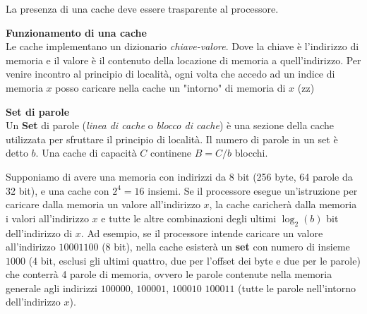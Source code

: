 \begin{note}
    La presenza di una cache deve essere trasparente al processore.
\end{note}

\begin{defn}
    \textbf{Funzionamento di una cache} \\
    Le cache implementano un dizionario \textit{chiave-valore}. Dove la chiave è
    l'indirizzo di memoria e il valore è il contenuto della locazione di memoria
    a quell'indirizzo. Per venire incontro al principio di località, ogni volta
    che accedo ad un indice di memoria $x$ posso caricare nella cache un
    "intorno" di memoria di $x$ (zz)
\end{defn}

\begin{defn}
    \textbf{Set di parole} \\
    Un \textbf{Set} di parole (\textit{linea di cache} o \textit{blocco di
    cache}) è una sezione della cache utilizzata per sfruttare il principio di
    località. Il numero di parole in un set è detto $b$. Una cache di capacità
    $C$ continene $B=C/b$ blocchi.
\end{defn}

\begin{exmp}
    Supponiamo di avere una memoria con indirizzi da 8 bit (256 byte, 64 parole
    da 32 bit), e una cache con $2^4 = 16$ insiemi. Se il processore esegue
    un'istruzione per caricare dalla memoria un valore all'indirizzo $x$, la
    cache caricherà dalla memoria i valori all'indirizzo $x$ e tutte le altre
    combinazioni degli ultimi $\log_2(b)$ bit dell'indirizzo di $x$. Ad esempio,
    se il processore intende caricare un valore all'indirizzo $10001100$ (8
    bit), nella cache esisterà un \textbf{set} con numero di insieme $1000$ (4
    bit, esclusi gli ultimi quattro, due per l'offset dei byte e due per le
    parole) che conterrà 4 parole di memoria, ovvero le parole contenute nella
    memoria generale agli indirizzi $100000$, $100001$, $100010$ $100011$ (tutte
    le parole nell'intorno dell'indirizzo $x$).
\end{exmp}

